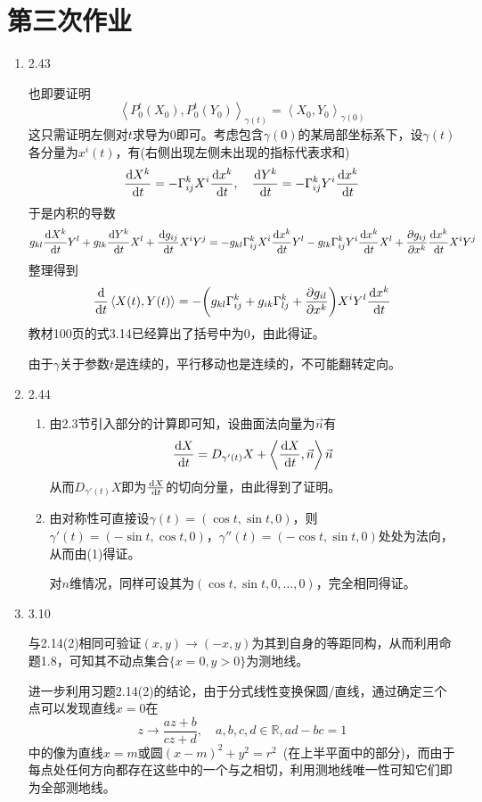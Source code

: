 \documentclass[a4paper,UTF8,fontset=windows,10pt]{ctexart}
\newcommand*{\dr}{\hspace{0.07em}\mathrm{d}}
\begin{document}
\section{第三次作业}
\begin{enumerate}
    \item 2.43
    
    也即要证明
    $$\left<P_0^t(X_0),P_0^t(Y_0)\right>_{\gamma(t)}=\left<X_0,Y_0\right>_{\gamma(0)}$$
    这只需证明左侧对$t$求导为0即可。考虑包含$\gamma(0)$的某局部坐标系下，设$\gamma(t)$各分量为$x^i(t)$，有(右侧出现左侧未出现的指标代表求和)
    $$\frac{\dr X^k}{\dr t}=-\Gamma_{ij}^kX^i\frac{\dr x^k}{\dr t},\quad\frac{\dr Y^k}{\dr t}=-\Gamma_{ij}^kY^i\frac{\dr x^k}{\dr t}$$
    于是内积的导数
    $$g_{kl}\frac{\dr X^k}{\dr t}Y^l+g_{lk}\frac{\dr Y^k}{\dr t}X^l+\frac{\dr g_{ij}}{\dr t}X^iY^j=-g_{kl}\Gamma_{ij}^kX^i\frac{\dr x^k}{\dr t}Y^l-g_{lk}\Gamma_{ij}^kY^i\frac{\dr x^k}{\dr t}X^l+\frac{\partial g_{ij}}{\partial x^k}\frac{\dr x^k}{\dr t}X^iY^j$$
    整理得到
    $$\frac{\dr}{\dr t}\left<X(t),Y(t)\right>=-\bigg(g_{kl}\Gamma_{ij}^k+g_{ik}\Gamma_{lj}^k+\frac{\partial g_{il}}{\partial x^k}\bigg)X^iY^l\frac{\dr x^k}{\dr t}$$
    教材100页的式3.14已经算出了括号中为0，由此得证。
    
    由于$\gamma$关于参数$t$是连续的，平行移动也是连续的，不可能翻转定向。
    
    \item 2.44
    \begin{enumerate}[(1)]
        \item 
        由2.3节引入部分的计算即可知，设曲面法向量为$\vec{n}$有
        $$\frac{\dr X}{\dr t}=D_{\gamma'(t)}X+\left<\frac{\dr X}{\dr t},\vec{n}\right>\vec{n}$$
        从而$D_{\gamma'(t)}X$即为$\frac{\dr X}{\dr t}$的切向分量，由此得到了证明。
    
        \item 由对称性可直接设$\gamma(t)=(\cos t,\sin t,0)$，则$\gamma'(t)=(-\sin t,\cos t,0)$，$\gamma''(t)=(-\cos t,\sin t,0)$处处为法向，从而由(1)得证。
        
        对$n$维情况，同样可设其为$(\cos t,\sin t,0,\dots,0)$，完全相同得证。
    \end{enumerate}
    
    \item 3.10
    
    与2.14(2)相同可验证$(x,y)\to(-x,y)$为其到自身的等距同构，从而利用命题1.8，可知其不动点集合$\{x=0,y>0\}$为测地线。
    
    进一步利用习题2.14(2)的结论，由于分式线性变换保圆/直线，通过确定三个点可以发现直线$x=0$在
    $$z\to\frac{az+b}{cz+d},\quad a,b,c,d\in\mathbb{R},ad-bc=1$$
    中的像为直线$x=m$或圆$(x-m)^2+y^2=r^2$\ (在上半平面中的部分)，而由于每点处任何方向都存在这些中的一个与之相切，利用测地线唯一性可知它们即为全部测地线。
    

\end{enumerate}
\end{document}
